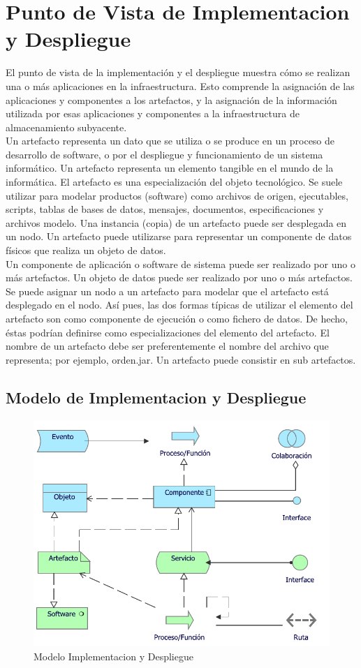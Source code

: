 \section{Punto de Vista de Implementacion y Despliegue}

El punto de vista de la implementación y el despliegue muestra cómo se realizan una o más aplicaciones en la infraestructura. Esto comprende la asignación de las aplicaciones y componentes a los artefactos, y la asignación de la información utilizada por esas aplicaciones y componentes a la infraestructura de almacenamiento subyacente.\\

Un artefacto representa un dato que se utiliza o se produce en un proceso de desarrollo de software, o por el despliegue y funcionamiento de un sistema informático. Un artefacto representa un elemento tangible en el mundo de la informática. El artefacto es una especialización del objeto tecnológico. Se suele utilizar para modelar productos (software) como archivos de origen, ejecutables, scripts, tablas de bases de datos, mensajes, documentos, especificaciones y archivos modelo. Una instancia (copia) de un artefacto puede ser desplegada en un nodo. Un artefacto puede utilizarse para representar un componente de datos físicos que realiza un objeto de datos.\\

Un componente de aplicación o software de sistema puede ser realizado por uno o más artefactos. Un objeto de datos puede ser realizado por uno o más artefactos. Se puede asignar un nodo a un artefacto para modelar que el artefacto está desplegado en el nodo. Así pues, las dos formas típicas de utilizar el elemento del artefacto son como componente de ejecución o como fichero de datos. De hecho, éstas podrían definirse como especializaciones del elemento del artefacto.
El nombre de un artefacto debe ser preferentemente el nombre del archivo que representa; por ejemplo, orden.jar. Un artefacto puede consistir en sub artefactos.

\clearpage

\subsection{Modelo de Implementacion y Despliegue}
\begin{figure}[h!]
	\centering
	\includegraphics[width=.7\linewidth]{imgs/modelo/Implementacion}
	\caption{Modelo Implementacion y Despliegue}
\end{figure}


